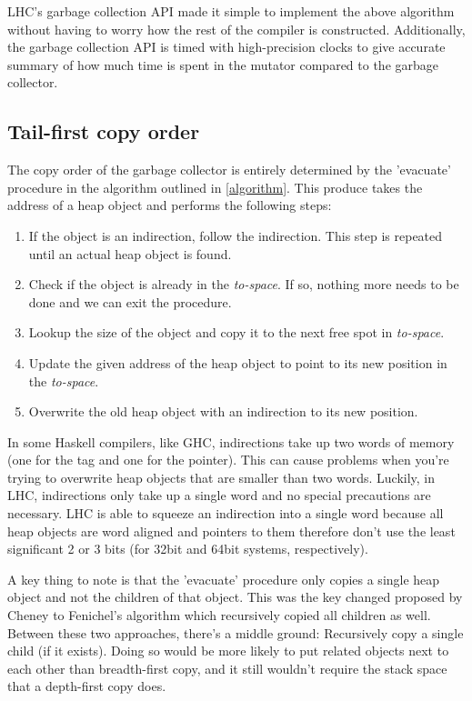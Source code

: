\documentclass[a4paper,oneside]{memoir}
\begin{document}
LHC's garbage collection API made it simple to implement the above algorithm
without having to worry how the rest of the compiler is constructed.
Additionally, the garbage collection API is timed with high-precision clocks
to give accurate summary of how much time is spent in the mutator compared to
the garbage collector.

\subsection{Tail-first copy order}


The copy order of the garbage collector is entirely determined by the 'evacuate'
procedure in the algorithm outlined in \ref{algorithm}. This produce takes the
address of a heap object and performs the following steps:
\begin{enumerate}
  \item If the object is an indirection, follow the indirection. This step is
  repeated until an actual heap object is found.
  \item Check if the object is already in the \emph{to-space}. If so, nothing
  more needs to be done and we can exit the procedure.
  \item Lookup the size of the object and copy it to the next free spot in
  \emph{to-space}.
  \item Update the given address of the heap object to point to its new position
  in the \emph{to-space}.
  \item Overwrite the old heap object with an indirection to its new position.
\end{enumerate}

In some Haskell compilers, like GHC, indirections take up two words of memory
(one for the tag and one for the pointer). This can cause problems when you're
trying to overwrite heap objects that are smaller than two words. Luckily, in
LHC, indirections only take up a single word and no special precautions are
necessary. LHC is able to squeeze an indirection into a single word because
all heap objects are word aligned and pointers to them therefore don't use the
least significant 2 or 3 bits (for 32bit and 64bit systems, respectively).

A key thing to note is that the 'evacuate' procedure only copies a single heap
object and not the children of that object. This was the key changed proposed
by Cheney to Fenichel's algorithm which recursively copied all children as well.
\cite{Fenichel,Cheney:1970} Between these two approaches, there's a middle
ground: Recursively copy a single child (if it exists). Doing so would be more
likely to put related objects next to each other than breadth-first copy, and
it still wouldn't require the stack space that a depth-first copy does.
\end{document}
